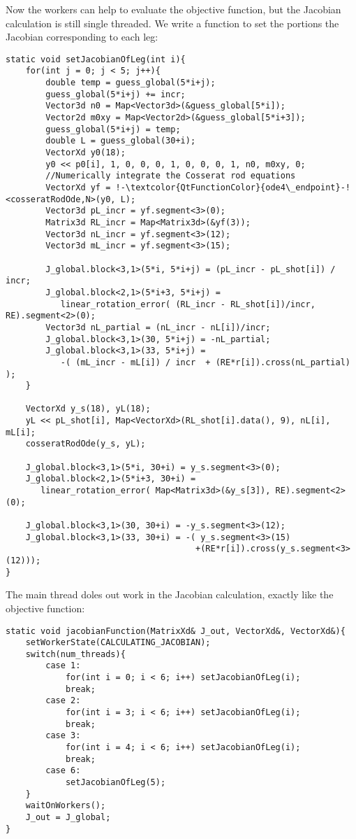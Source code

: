 \documentclass[12pt]{article}
\begin{document}
\clearpage \noindent
Now the workers can help to evaluate the objective function, but the Jacobian calculation is still single threaded.
We write a function to set the portions the Jacobian corresponding to each leg:
\begin{lstlisting}
static void setJacobianOfLeg(int i){
    for(int j = 0; j < 5; j++){
        double temp = guess_global(5*i+j);
        guess_global(5*i+j) += incr;
        Vector3d n0 = Map<Vector3d>(&guess_global[5*i]);
        Vector2d m0xy = Map<Vector2d>(&guess_global[5*i+3]);
        guess_global(5*i+j) = temp;
        double L = guess_global(30+i);
        VectorXd y0(18);
        y0 << p0[i], 1, 0, 0, 0, 1, 0, 0, 0, 1, n0, m0xy, 0;
        //Numerically integrate the Cosserat rod equations
        VectorXd yf = !-\textcolor{QtFunctionColor}{ode4\_endpoint}-!<cosseratRodOde,N>(y0, L);
        Vector3d pL_incr = yf.segment<3>(0);
        Matrix3d RL_incr = Map<Matrix3d>(&yf(3));
        Vector3d nL_incr = yf.segment<3>(12);
        Vector3d mL_incr = yf.segment<3>(15);

        J_global.block<3,1>(5*i, 5*i+j) = (pL_incr - pL_shot[i]) / incr;
        J_global.block<2,1>(5*i+3, 5*i+j) =
           linear_rotation_error( (RL_incr - RL_shot[i])/incr, RE).segment<2>(0);
        Vector3d nL_partial = (nL_incr - nL[i])/incr;
        J_global.block<3,1>(30, 5*i+j) = -nL_partial;
        J_global.block<3,1>(33, 5*i+j) =
           -( (mL_incr - mL[i]) / incr  + (RE*r[i]).cross(nL_partial) );
    }

    VectorXd y_s(18), yL(18);
    yL << pL_shot[i], Map<VectorXd>(RL_shot[i].data(), 9), nL[i], mL[i];
    cosseratRodOde(y_s, yL);

    J_global.block<3,1>(5*i, 30+i) = y_s.segment<3>(0);
    J_global.block<2,1>(5*i+3, 30+i) =
       linear_rotation_error( Map<Matrix3d>(&y_s[3]), RE).segment<2>(0);

    J_global.block<3,1>(30, 30+i) = -y_s.segment<3>(12);
    J_global.block<3,1>(33, 30+i) = -( y_s.segment<3>(15)
                                      +(RE*r[i]).cross(y_s.segment<3>(12)));
}
\end{lstlisting}
The main thread doles out work in the Jacobian calculation, exactly like the objective function:
\begin{lstlisting}
static void jacobianFunction(MatrixXd& J_out, VectorXd&, VectorXd&){
    setWorkerState(CALCULATING_JACOBIAN);
    switch(num_threads){
        case 1:
            for(int i = 0; i < 6; i++) setJacobianOfLeg(i);
            break;
        case 2:
            for(int i = 3; i < 6; i++) setJacobianOfLeg(i);
            break;
        case 3:
            for(int i = 4; i < 6; i++) setJacobianOfLeg(i);
            break;
        case 6:
            setJacobianOfLeg(5);
    }
    waitOnWorkers();
    J_out = J_global;
}
\end{lstlisting}
\end{document}
